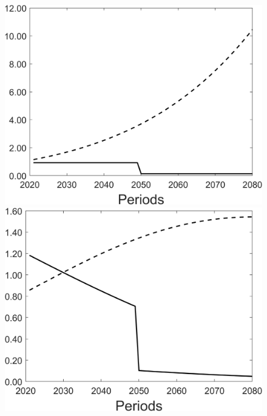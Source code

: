\begin{figure}[h!!]
\begin{minipage}[]{0.32\textwidth}
	\end{minipage}
	\begin{minipage}[]{0.32\textwidth}
		\includegraphics[width=1\textwidth]{../../codding_model/Own/figures/Rep_agent/staticRam_LF_separate_yd_periods59_eppsilon0.40_zeta1.40_Ad08_Ac04_thetac0.70_thetad0.56_HetGrowth1_tauul0.181_util0_withtarget1_lgd0.png}
	\end{minipage}
	\begin{minipage}[]{0.32\textwidth}
		\includegraphics[width=1\textwidth]{../../codding_model/Own/figures/Rep_agent/staticRam_LF_separate_xd_periods59_eppsilon0.40_zeta1.40_Ad08_Ac04_thetac0.70_thetad0.56_HetGrowth1_tauul0.181_util0_withtarget1_lgd0.png}

\end{minipage}
\end{figure}
